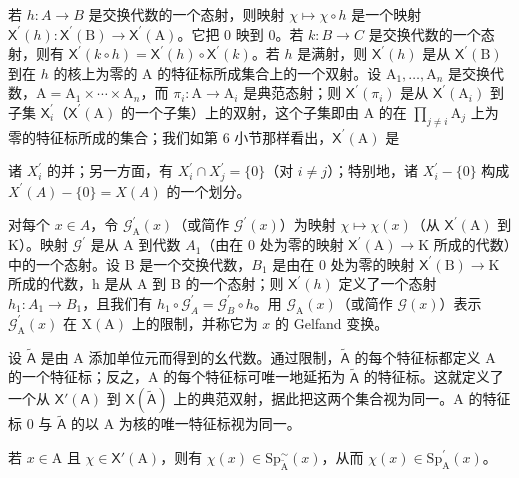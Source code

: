 若 \(h\colon A\to B\) 是交换代数的一个态射，则映射 \(\chi\mapsto\chi\circ h\) 是一个映射 \(\mathsf{X}^{\prime}(h)\colon\mathsf{X}^{\prime}(\mathrm{B})\to\mathsf{X}^{\prime}(\mathrm{A})\)。它把 0 映到 0。若 \(k\colon B\to C\) 是交换代数的一个态射，则有 \(\mathsf{X}^{\prime}(k\circ h)=\mathsf{X}^{\prime}(h)\circ\mathsf{X}^{\prime}(k)\)。若 \(h\) 是满射，则 \(\mathsf{X}^{\prime}(h)\) 是从 \(\mathsf{X}^{\prime}(\mathrm{B})\) 到在 \(h\) 的核上为零的 A 的特征标所成集合上的一个双射。设 \(\mathrm{A}_{1},\ldots,\mathrm{A}_{n}\) 是交换代数，\(\mathrm{A}=\mathrm{A}_{1}\times\cdots\times\mathrm{A}_{n}\)，而 \(\pi_{i}\colon\mathrm{A}\to\mathrm{A}_{i}\) 是典范态射；则 \(\mathsf{X}^{\prime}(\pi_{i})\) 是从 \(\mathsf{X}^{\prime}(\mathrm{A}_{i})\) 到子集 \(\mathsf{X}_{i}^{\prime}\)（\(\mathsf{X}^{\prime}(\mathrm{A})\) 的一个子集）上的双射，这个子集即由 A 的在 \(\prod_{j\neq i}\mathrm{A}_{j}\) 上为零的特征标所成的集合；我们如第 6 小节那样看出，\(\mathsf{X}^{\prime}(\mathrm{A})\) 是

诸 \(X_{i}^{\prime}\) 的并；另一方面，有 \(X_{i}^{\prime} \cap X_{j}^{\prime} = \{0\}\)（对 \(i \neq j\)）；特别地，诸 \(X_{i}^{\prime} - \{0\}\) 构成 \(X^{\prime}(A) - \{0\} = X(A)\) 的一个划分。

对每个 \(x \in A\)，令 \(\mathcal{G}_{\mathrm{A}}^{\prime}(x)\)（或简作 \(\mathcal{G}^{\prime}(x)\)）为映射 \(\chi \mapsto \chi(x)\)（从 \(\mathsf{X}^{\prime}(\mathrm{A})\) 到 K）。映射 \(\mathcal{G}^{\prime}\) 是从 A 到代数 \(A_{1}\)（由在 0 处为零的映射 \(\mathsf{X}^{\prime}(\mathrm{A}) \to \mathrm{K}\) 所成的代数）中的一个态射。设 B 是一个交换代数，\(B_{1}\) 是由在 0 处为零的映射 \(\mathsf{X}^{\prime}(\mathrm{B}) \to \mathrm{K}\) 所成的代数，h 是从 A 到 B 的一个态射；则 \(\mathsf{X}^{\prime}(h)\) 定义了一个态射 \(h_{1}: A_{1} \to B_{1}\)，且我们有 \(h_{1} \circ \mathcal{G}_{A}^{\prime} = \mathcal{G}_{B}^{\prime} \circ h\)。用 \(\mathcal{G}_{\mathrm{A}}(x)\)（或简作 \(\mathcal{G}(x)\)）表示 \(\mathcal{G}_{\mathrm{A}}^{\prime}(x)\) 在 \(\mathrm{X}(\mathrm{A})\) 上的限制，并称它为 \(x\) 的 Gelfand 变换。

设 \(\widetilde{\mathsf{A}}\) 是由 A 添加单位元而得到的幺代数。通过限制，\(\widetilde{\mathsf{A}}\) 的每个特征标都定义 A 的一个特征标；反之，A 的每个特征标可唯一地延拓为 \(\widetilde{\mathsf{A}}\) 的特征标。这就定义了一个从 \(\mathsf{X}'(\mathsf{A})\) 到 \(\mathsf{X}(\widetilde{\mathsf{A}})\) 上的典范双射，据此把这两个集合视为同一。A 的特征标 0 与 \(\widetilde{\mathsf{A}}\) 的以 A 为核的唯一特征标视为同一。

若 \(x\in \mathrm{A}\) 且 \(\chi \in \mathsf{X}'(\mathrm{A})\)，则有 \(\chi (x)\in \mathrm{Sp}_{\widetilde{\mathrm{A}}}^{\sim}(x)\)，从而 \(\chi (x)\in \mathrm{Sp}_{\mathrm{A}}^{\prime}(x)\)。

